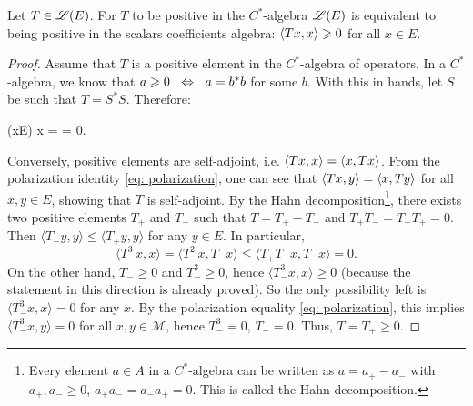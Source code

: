 \begin{proposicao}
    Let $T\in \mathscr L(E)$. For $T$ to be positive in the $C^*$-algebra $\mathscr L(E)$ is equivalent to being positive in the scalars coefficients algebra: $\langle {Tx},{x}\rangle \geqslant 0$ for all $x\in E$.
    \begin{proof}
    Assume that $T$ is a positive element in the $C^*$-algebra of operators. In a $C^*$-algebra, we know that $a \geqslant 0 \operatorname{\hspace{0.25cm}\Leftrightarrow\hspace{0.25cm}} a=b^*b$ for some $b$. With this in hands, let $S$ be such that $T = S^*S$. Therefore:
    \begin{eqspaced}{(x\in E)}
    x =  =  \bilateral{-0.25cm}{\overset{\ref{def: pre-hilb module}\ref{def item: positivo definido}}\geq} 0.
    \end{eqspaced}
    Conversely, positive elements are self-adjoint, i.e. $\langle {Tx},{x}\rangle = \langle {x},{Tx}\rangle$. From the polarization identity \ref{eq: polarization}, one can see that $\langle {Tx},{y}\rangle = \langle {x},{Ty}\rangle$ for all $x,y \in E$, showing that $T$ is self-adjoint. By the Hahn decomposition\footnote{Every element $a\in A$ in a $C^*$-algebra can be written as $a = a_+-a_-$ with $a_+, a_-\geqslant 0$, $a_+a_-=a_-a_+=0$. This is called the Hahn decomposition.}, there exists two positive elements $T_+$ and $T_-$ such that $T = T_+-T_-$ and $T_+T_-= T_-T_+ = 0$. Then $\langle T_{-} y, y\rangle \leq\langle T_{+} y, y\rangle$ for any $y \in E$. In particular,
    $$
    \langle T_{-}^{3} x, x\rangle=\langle T_{-}^{2} x, T_{-} x\rangle \leq\langle T_{+} T_{-} x, T_{-} x\rangle=0 .
    $$
    On the other hand, $T_{-} \geq 0$ and $T_{-}^{3} \geq 0$, hence $\langle T_{-}^{3} x, x\rangle \geq 0$ (because the statement in this direction is already proved). So the only possibility left is $\langle T_{-}^{3} x, x\rangle=0$ for any $x $. By the polarization equality \ref{eq: polarization}, this implies $\langle T_{-}^{3} x, y\rangle=0$ for all $x, y \in \mathcal{M}$, hence $T_{-}^{3}=0$, $T_{-}=0$. Thus, $T=T_{+} \geq 0$.
    \end{proof}
\end{proposicao}
    
